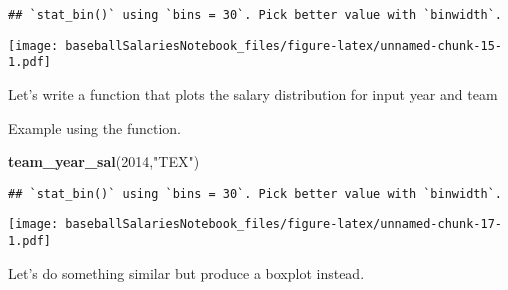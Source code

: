 \documentclass[]{article}
\newenvironment{Shaded}{\begin{snugshade}}{\end{snugshade}}
\newcommand{\KeywordTok}[1]{\textcolor[rgb]{0.13,0.29,0.53}{\textbf{#1}}}
\newcommand{\DataTypeTok}[1]{\textcolor[rgb]{0.13,0.29,0.53}{#1}}
\newcommand{\DecValTok}[1]{\textcolor[rgb]{0.00,0.00,0.81}{#1}}
\newcommand{\StringTok}[1]{\textcolor[rgb]{0.31,0.60,0.02}{#1}}
\newcommand{\ControlFlowTok}[1]{\textcolor[rgb]{0.13,0.29,0.53}{\textbf{#1}}}
\newcommand{\OperatorTok}[1]{\textcolor[rgb]{0.81,0.36,0.00}{\textbf{#1}}}
\newcommand{\NormalTok}[1]{#1}
\begin{document}
\begin{verbatim}
## `stat_bin()` using `bins = 30`. Pick better value with `binwidth`.
\end{verbatim}

\texttt{[image: baseballSalariesNotebook\_files/figure-latex/unnamed-chunk-15-1.pdf]}

Let's write a function that plots the salary distribution for input year
and team

\begin{Shaded}
\end{Shaded}

Example using the function.

\begin{Shaded}
\begin{Highlighting}[]
\KeywordTok{team_year_sal}\NormalTok{(}\DecValTok{2014}\NormalTok{,}\StringTok{"TEX"}\NormalTok{)}
\end{Highlighting}
\end{Shaded}

\begin{verbatim}
## `stat_bin()` using `bins = 30`. Pick better value with `binwidth`.
\end{verbatim}

\texttt{[image: baseballSalariesNotebook\_files/figure-latex/unnamed-chunk-17-1.pdf]}

Let's do something similar but produce a boxplot instead.
\end{document}
